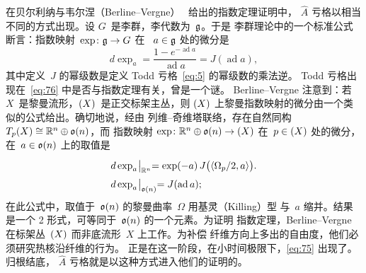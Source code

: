 \documentclass[11pt]{amsart}
\theoremstyle{definition}
\theoremstyle{remark}
\theoremstyle{plain}
\numberwithin{equation}{section}
\renewcommand{\:}{\colon}
\newcommand{\Ahat}{{\hat A}}
\newcommand{\RR}{{\mathbb R}}
\DeclareRobustCommand{\mstrut}{^{\vphantom{1*\prime y\vee M}}}
\newcommand{\res}[1]{\negmedspace\bigm|\mstrut_{#1}}
\let\O\relax
\DeclareMathOperator{\O}{O}
\let\O\relax\DeclareMathOperator{\O}{O}
\DeclareMathOperator{\ad}{ad}
\newcommand{\Rn}{\RR^n}
\begin{document}
在贝尔利纳与韦尔涅（Berline–Vergne）~\cite{BV} 给出的指数定理证明中，
$\Ahat$ 亏格以相当不同的方式出现。设 $G$~是李群，李代数为~$\frak{g}$。于是
李群理论中的一个标准公式断言：指数映射~$\exp\:\frak{g}\to G$ 在
~$a\in \frak{g}$ 处的微分是
  \begin{equation}\label{eq:76}
     d\exp_a = \frac{1-e^{-\ad a}}{\ad a} = J (\ad a),
  \end{equation}
其中定义~$J$ 的幂级数是定义 Todd 亏格~\eqref{eq:5} 的幂级数的乘法逆。
Todd 亏格出现在~\eqref{eq:76} 中是否与指数定理有关，曾是一个谜。
Berline–Vergne 注意到：若 $X$~是黎曼流形，$\O(X)$~是正交标架主丛，则
$\O(X)$ 上黎曼指数映射的微分由一个类似的公式给出。确切地说，经由
列维–奇维塔联络，存在自然同构 $T_p\O(X)\cong \Rn\oplus\frak{o}(n) $，而
指数映射 $\exp\:\Rn\oplus\frak{o}(n)\to \O(X)$ 在~$p\in \O(X)$ 处的微分，
在~$a\in \frak{o}(n)$ 上的取值是
  \begin{equation}\label{eq:75}
     \begin{aligned} &d\exp_a\res{\Rn} = \exp(-a)\,J \bigl( \langle
     \Omega _p/2,a\rangle\bigr).\\ &d\exp_a\res{\frak{o}(n)}=J
     (\ad a); 
     \end{aligned} 
  \end{equation}
在此公式中，取值于~$\frak{o}(n)$ 的黎曼曲率~$\Omega $ 用基灵（Killing）型
与~$a$ 缩并。结果是一个 2 形式，可等同于~$\frak{o}(n)$ 的一个元素。为证明
指数定理，Berline–Vergne 在标架丛~$\O(X)$ 而非底流形~$X$ 上工作。为补偿
纤维方向上多出的自由度，他们必须研究热核沿纤维的行为。
正是在这一阶段，在小时间极限下，\eqref{eq:75} 出现了。归根结底，
$\Ahat$ 亏格就是以这种方式进入他们的证明的。
\end{document}
